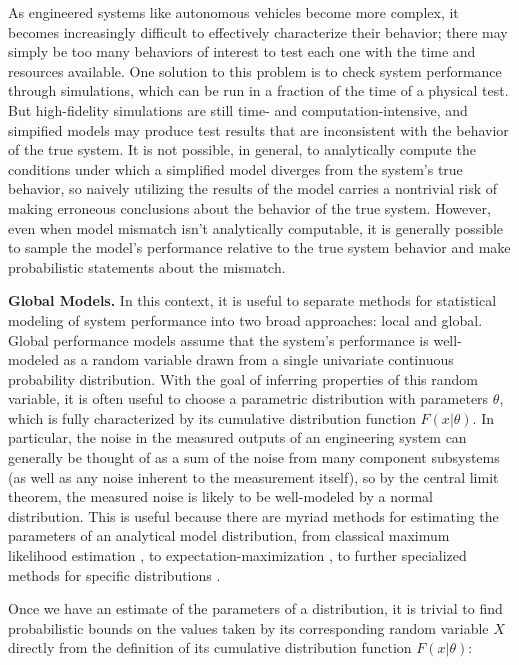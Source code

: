 \documentclass[12pt, conference]{IEEEtran}
\begin{document}
As engineered systems like autonomous vehicles become more complex, it becomes increasingly difficult to effectively characterize their behavior; there may simply be too many behaviors of interest to test each one with the time and resources available. One solution to this problem is to check system performance through simulations, which can be run in a fraction of the time of a physical test. But high-fidelity simulations are still time- and computation-intensive, and simpified models may produce test results that are inconsistent with the behavior of the true system. It is not possible, in general, to analytically compute the conditions under which a simplified model diverges from the system's true behavior, so naively utilizing the results of the model carries a nontrivial risk of making erroneous conclusions about the behavior of the true system. However, even when model mismatch isn't analytically computable, it is generally possible to sample the model's performance relative to the true system behavior and make probabilistic statements about the mismatch.
\newline

\noindent\textbf{Global Models.} In this context, it is useful to separate methods for statistical modeling of system performance into two broad approaches: local and global. Global performance models assume that the system's performance is well-modeled as a random variable drawn from a single univariate continuous probability distribution. With the goal of inferring properties of this random variable, it is often useful to choose a parametric distribution with parameters $\theta$, which is fully characterized by its cumulative distribution function $F(x|\theta)$. In particular, the noise in the measured outputs of an engineering system can generally be thought of as a sum of the noise from many component subsystems (as well as any noise inherent to the measurement itself), so by the central limit theorem, the measured noise is likely to be well-modeled by a normal distribution. This is useful because there are myriad methods for estimating the parameters of an analytical model distribution, from classical maximum likelihood estimation \cite{gelman13}, to expectation-maximization \cite{dempster77}, to further specialized methods for specific distributions \cite{tang19,ren22}.

Once we have an estimate of the parameters of a distribution, it is trivial to find probabilistic bounds on the values taken by its corresponding random variable $X$ directly from the definition of its cumulative distribution function $F(x|\theta)$:
\end{document}
